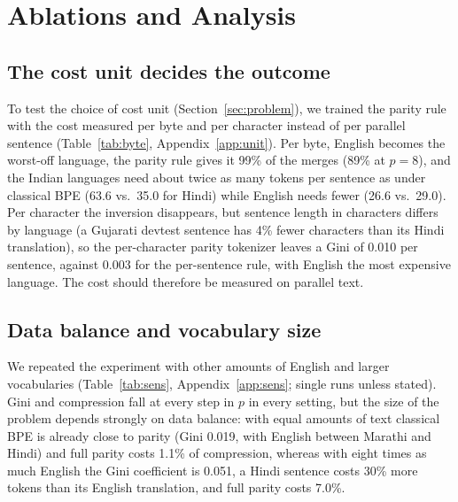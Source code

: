 \section{Ablations and Analysis}
\label{sec:ablation}

\subsection{The cost unit decides the outcome}
\label{sec:unitresult}

To test the choice of cost unit (Section~\ref{sec:problem}), we trained the parity rule
with the cost measured per byte and per character instead of per parallel sentence
(Table~\ref{tab:byte}, Appendix~\ref{app:unit}). Per byte, English becomes the worst-off language, the parity rule gives it 99\% of the
merges (89\% at $p=8$), and the Indian languages need about twice as many tokens per
sentence as under classical BPE (63.6 vs.\ 35.0 for Hindi) while English needs fewer (26.6
vs.\ 29.0). Per character the inversion disappears, but sentence length in characters
differs by language (a Gujarati devtest sentence has 4\% fewer characters than its Hindi
translation), so the per-character parity tokenizer leaves a Gini of 0.010 per sentence,
against 0.003 for the per-sentence rule, with English the most expensive language. The cost
should therefore be measured on parallel text.


\subsection{Data balance and vocabulary size}
\label{sec:sens}

We repeated the experiment with other amounts of English and larger vocabularies
(Table~\ref{tab:sens}, Appendix~\ref{app:sens}; single runs unless stated). Gini and
compression fall at every step in $p$ in every setting, but the size of the problem depends
strongly on data balance: with equal amounts of text classical BPE is already close to
parity (Gini 0.019, with English between Marathi and Hindi) and full parity costs 1.1\% of
compression, whereas with eight times as much English the Gini coefficient is 0.051, a
Hindi sentence costs 30\% more tokens than its English translation, and full parity costs
7.0\%.

